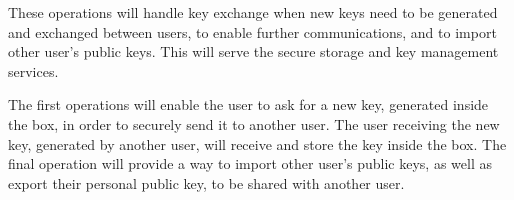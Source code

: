These operations will handle key exchange when new keys need to be generated and exchanged between users, to enable further communications, and to import other user's public keys. This will serve the secure storage and key management services.

The first operations will enable the user to ask for a new key, generated inside the box, in order to securely send it to another user. The user receiving the new key, generated by another user, will receive and store the key inside the box.
The final operation will provide a way to import other user's public keys, as well as export their personal public key, to be shared with another user.

